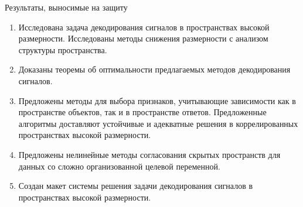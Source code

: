 \documentclass[10pt]{beamer}
\begin{document}
\begin{frame}{Результаты, выносимые на защиту}
\begin{enumerate}
	\item Исследована задача декодирования сигналов в пространствах высокой размерности. Исследованы методы снижения размерности с анализом структуры пространства.
	\vfill
	\item Доказаны теоремы об оптимальности предлагаемых методов декодирования сигналов.
	\vfill 
	\item Предложены методы для выбора признаков, учитывающие зависимости как в пространстве объектов, так и в пространстве ответов. Предложенные алгоритмы доставляют устойчивые и адекватные решения в коррелированных пространствах высокой размерности.
	\vfill
	\item Предложены нелинейные методы согласования скрытых пространств для данных со сложно организованной целевой переменной.
	\vfill
	\item Создан макет системы решения задачи декодирования сигналов в пространствах высокой размерности.
\end{enumerate}
\end{frame}
\end{document}
